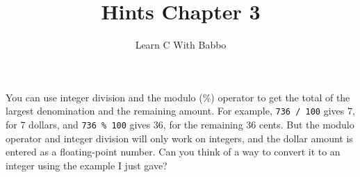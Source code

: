 \documentclass{article}
\begin{document}
\title{Hints Chapter 3}
\author{Learn C With Babbo}
\date{}
\maketitle
You can use integer division and the modulo (\%) operator to get the total of the largest denomination and the remaining
amount. For example, \verb|736 / 100| gives 7, for 7 dollars, and \verb|736 % 100| gives 36, for the remaining 36 cents.
But the modulo operator and integer division will only work on integers, and the dollar amount is entered as a
floating-point number. Can you think of a way to convert it to an integer using the example I just gave?
\end{document}
